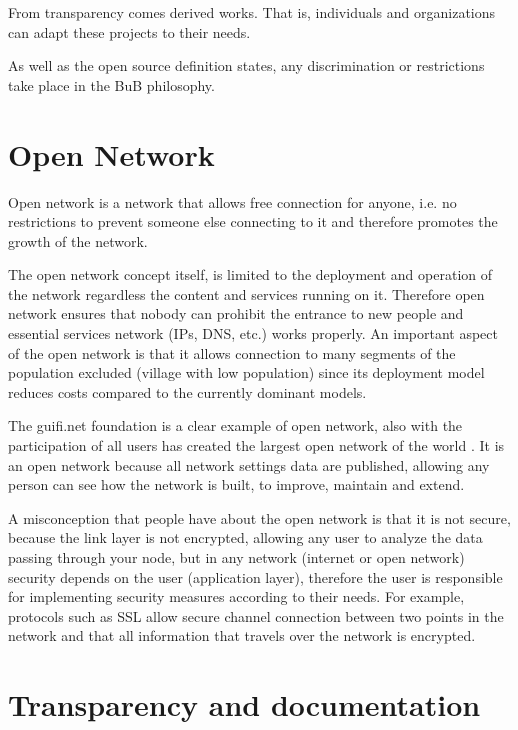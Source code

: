 \documentclass[draftclsnofoot,12pt,journal,onecolumn]{IEEEtran}
\begin{document}
From transparency comes derived works. That is, individuals and organizations can adapt these projects to their needs.

As well as the open source definition states, any discrimination or restrictions take place in the BuB philosophy.




\section{Open Network}
\label{sec:open-network}

Open network is a network that allows free connection for anyone, i.e. no restrictions to prevent someone else connecting to it and therefore promotes the growth of the network.


The open network concept itself, is limited to the deployment and operation of the network regardless the content and services running on it. Therefore open network ensures that nobody can prohibit the entrance to new people and essential services network (IPs, DNS, etc.) works properly. An important aspect of the open network is that it allows connection to many segments of the population excluded (village with low population) since its deployment model reduces costs compared to the currently dominant models.


The guifi.net foundation is a clear example of open network, also with the participation of all users has created the largest open network of the world \cite{oliver2010wca}. It is an open network because all network settings data are published, allowing any person can see how the network is built, to improve, maintain and extend.


A misconception that people have about the open network is that it is not secure, because the link layer is not encrypted, allowing any user to analyze the data passing through your node, but in any network (internet or open network) security depends on the user (application layer), therefore the user is responsible for implementing security measures according to their needs. For example, protocols such as SSL allow secure channel connection between two points in the network and that all information that travels over the network is encrypted.


\section{Transparency and documentation}
\label{sec:documentation}
\end{document}

